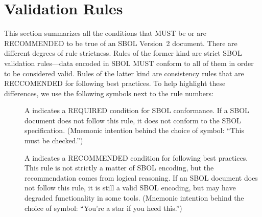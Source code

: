 \newcommand{\printValid}{\validRule{sbol-\arabic{sbolCtr}\addtocounter{sbolCtr}{1}}}
\newcommand{\printModeling}{\modelingRule{sbol-\arabic{sbolCtr}\addtocounter{sbolCtr}{1}}}

\section{Validation Rules}
\label{validation}


This section summarizes all the conditions that MUST be or 
are RECOMMENDED to be true of an SBOL Version~2 document.  
There are different degrees of rule strictness.  
Rules of the former kind are strict SBOL validation rules---data encoded in SBOL MUST conform to
all of them in order to be considered valid.  Rules of the latter kind
are consistency rules that are RECCOMENDED for following best practices.  To help highlight these differences, we use the
following symbols next to the rule numbers:

\begin{description}

\item[\hspace*{6.5pt}\vSymbol\vsp] A \vSymbolName indicates a
  REQUIRED condition for SBOL conformance. If a SBOL document does not follow this rule, it does not conform to the SBOL
  specification.  (Mnemonic intention behind the choice of symbol:
  ``This must be checked.'')


\item[\hspace*{6.5pt}\mSymbol\msp] A \mSymbolName indicates a 
  RECOMMENDED condition for following best practices.  This rule is not strictly
  a matter of SBOL encoding, but the recommendation comes from logical
  reasoning.  If an SBOL document does not follow this rule, it is still a valid SBOL encoding, but may have degraded functionality in some tools.  (Mnemonic intention behind the choice of symbol: ``You're a star if you heed this.'')

\end{description}

